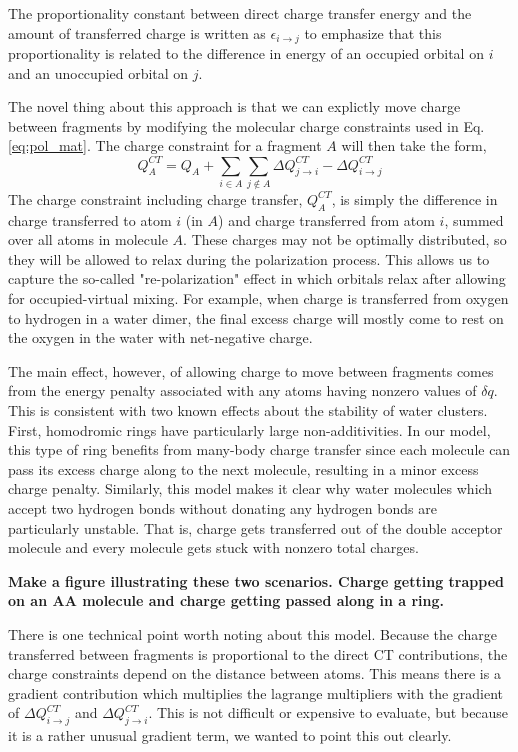\documentclass[journal=jacsat,manuscript=article]{achemso}
\begin{document}
The proportionality constant between direct charge transfer
energy and the amount of transferred charge is written as $\epsilon_{i\rightarrow j}$
to emphasize that this proportionality is related to the difference in energy
of an occupied orbital on $i$ and an unoccupied orbital on $j$.\cite{khaliullin2007unravelling}

The novel thing about this approach is that we can explictly move charge between
fragments by modifying the molecular charge constraints used in Eq. \ref{eq:pol_mat}.
The charge constraint for a fragment $A$ will then take the form,
\begin{equation}
  Q^{CT}_A=Q_A+\sum_{i\in A}\sum_{j\notin A}\Delta Q^{CT}_{j\rightarrow i}-\Delta Q^{CT}_{i\rightarrow j}
  \label{eq:charge_constraint}
\end{equation}
The charge constraint including charge transfer, $Q^{CT}_A$, is simply the
difference in charge transferred to atom $i$ (in $A$) and charge transferred from atom
$i$, summed over all atoms in molecule $A$. These charges may not be optimally
distributed, so they will be allowed to relax during the polarization process.
This allows us to capture the so-called "re-polarization"\cite{khaliullin2007unravelling}
effect in which orbitals relax after allowing for occupied-virtual mixing.
For example, when charge is transferred from oxygen to hydrogen in a water
dimer, the final excess charge will mostly come to rest on the oxygen in
the water with net-negative charge.

The main effect, however, of allowing charge to move between fragments comes from
the energy penalty associated with any atoms having nonzero values of $\delta q$.
This is consistent with two known effects about the stability of water clusters.
First, homodromic rings have particularly large non-additivities.\cite{xantheas2000cooperativity}
In our model, this type of ring benefits from many-body charge transfer since each molecule
can pass its excess charge along to the next molecule, resulting in a minor excess charge penalty.
Similarly, this model makes it clear why water molecules which accept two hydrogen bonds without
donating any hydrogen bonds are particularly unstable. That is, charge
gets transferred out of the double acceptor molecule and every molecule gets
stuck with nonzero total charges.

\textbf{Make a figure illustrating these two scenarios. Charge getting
trapped on an AA molecule and charge getting passed along in a ring.}

There is one technical point worth noting about this model. Because the
charge transferred between fragments is proportional to the direct CT contributions,
the charge constraints depend on the distance between atoms. This means there
is a gradient contribution which multiplies the lagrange multipliers
with the gradient of $\Delta Q^{CT}_{i\rightarrow j}$ and $\Delta Q^{CT}_{j\rightarrow i}$.
This is not difficult or expensive to evaluate, but because it is a rather
unusual gradient term, we wanted to point this out clearly.
\end{document}
